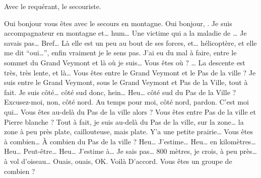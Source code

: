 Avec  le requérant,  le secouriste.

\begin{dialogue*}
  \Sec Oui bonjour vous êtes avec le secours en montagne.
  \Req Oui bonjour, . Je suis accompagnateur en
  montagne et… hum… Une victime qui a la maladie de …
  Je savais pas… Bref… Là elle est un peu au bout de ses forces, et…
   hélicoptère, et elle me dit \enquote{oui…}, enfin
  vraiment je le sens pas. J'ai eu du mal à faire, entre le sommet du
  Grand Veymont et là où je suis…
  \Sec {} Vous êtes où ?
  \Req … La descente est très, très lente, et là…
  \Sec {} Vous êtes entre le Grand Veymont
  et le Pas de la ville ?
  \Req Je suis entre le Grand Veymont, sous le Grand Veymont et Pas de
  la Ville, tout à fait. Je suis côté… côté sud donc, hein…
  \Sec Heu… côté sud du Pas de la Ville ?
  \Req Excusez-moi, non, côté nord. Au temps pour moi, côté nord,
  pardon. C'est moi qui…
  \Sec Vous êtes au-delà du Pas de la ville alors ? Vous êtes entre
  Pas de la ville et Pierre blanche ?
  \Req Tout à fait, je suis au-delà du Pas de la ville, sur la zone…
  la zone à peu près plate, caillouteuse, mais plate. Y'a une petite
  prairie…
  \Sec Vous êtes à combien… À combien du Pas de la ville ?
  \Req Heu… J'estime… Heu… en kilomètres… Heu… Peut-être… Heu…
  J'estime à… Je sais pas… 800 mètres, je crois, à peu près… à vol
  d'oiseau…
  \Sec Ouais, ouais, OK.
  \Req Voilà
  \Sec D'accord. Vous êtes un groupe de combien ?
\end{dialogue*}